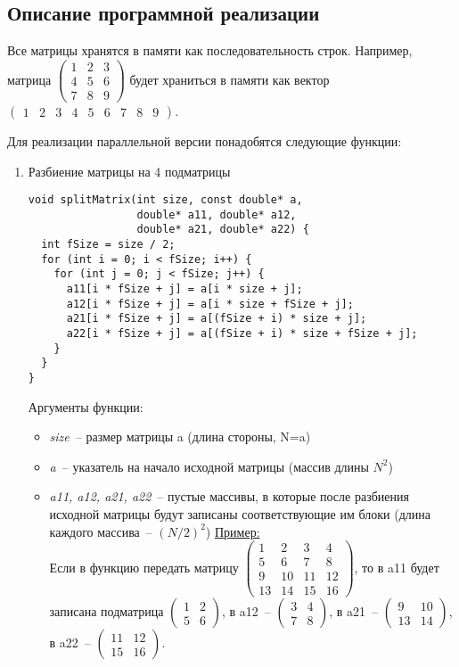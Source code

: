 \documentclass{report}
\begin{document}
\begin{center}
\section*{Описание программной реализации}
\par Все матрицы хранятся в памяти как последовательность строк. Например, матрица $\begin{pmatrix}1 & 2 & 3 \\ 4 & 5 & 6 \\ 7 & 8 & 9\end{pmatrix}$ будет храниться в памяти как вектор \\ $\begin{pmatrix}1 & 2 & 3 & 4 & 5 & 6 & 7 & 8 & 9\end{pmatrix}$.
\par Для реализации параллельной версии понадобятся следующие функции:
\begin{enumerate}
\item Разбиение матрицы на 4 подматрицы
\begin{lstlisting}
void splitMatrix(int size, const double* a,
                 double* a11, double* a12,
                 double* a21, double* a22) {
  int fSize = size / 2;
  for (int i = 0; i < fSize; i++) {
    for (int j = 0; j < fSize; j++) {
      a11[i * fSize + j] = a[i * size + j];
      a12[i * fSize + j] = a[i * size + fSize + j];
      a21[i * fSize + j] = a[(fSize + i) * size + j];
      a22[i * fSize + j] = a[(fSize + i) * size + fSize + j];
    }
  }
}
\end{lstlisting}
\par Аргументы функции:
\begin{itemize}
\item \textit{size}~-- размер матрицы a (длина стороны, N=a)
\item \textit{a}~-- указатель на начало исходной матрицы (массив длины $N^2$)
\item \textit{a11, a12, a21, a22}~-- пустые массивы, в которые после разбиения исходной матрицы будут записаны соответствующие им блоки (длина каждого массива~-- $(N/2)^2$)
\underline{Пример:}\\
Если в функцию передать матрицу $\begin{pmatrix}1 & 2 & 3 & 4 \\ 5 & 6 & 7 & 8 \\ 9 & 10 & 11 & 12 \\ 13 & 14 & 15 & 16\end{pmatrix}$, то в a11 будет записана подматрица $\begin{pmatrix}1 & 2 \\ 5 & 6\end{pmatrix}$, в a12~-- $\begin{pmatrix}3 & 4 \\7 & 8\end{pmatrix}$, в a21~-- $\begin{pmatrix}9 & 10 \\ 13 & 14\end{pmatrix}$, в a22~-- $\begin{pmatrix}11 & 12 \\ 15 & 16\end{pmatrix}$.

\end{itemize}
\end{enumerate}
\end{center}
\end{document}
